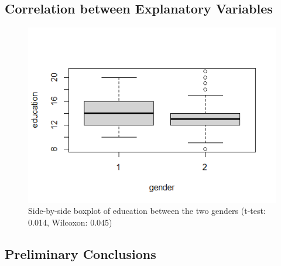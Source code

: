 \subsection{Correlation between Explanatory Variables}

\begin{figure}[H]
\centering
\includegraphics[width=0.5\linewidth]{../../plots/box_correlation.png}
\caption{Side-by-side boxplot of education between the two genders (t-test: 0.014, Wilcoxon: 0.045)}
\label{tab:boxplot.correlation}
\end{figure}

\subsection{Preliminary Conclusions}